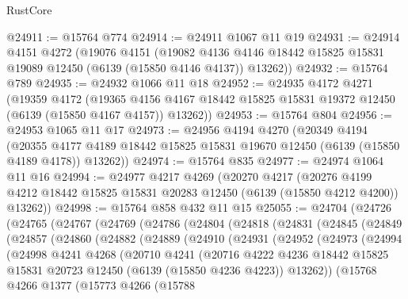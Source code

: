 \begin{lexlean}{RustCore}
\begin{coremodule}
@24911 := @15764 @774
@24914 := @24911 @1067 @11 @19
@24931 := @24914
    @4151
    @4272
    (@19076
      @4151
      (@19082 @4136 @4146 @18442 @15825 @15831 @19089 @12450 (@6139 (@15850 @4146 @4137)) @13262))
@24932 := @15764 @789
@24935 := @24932 @1066 @11 @18
@24952 := @24935
    @4172
    @4271
    (@19359
      @4172
      (@19365 @4156 @4167 @18442 @15825 @15831 @19372 @12450 (@6139 (@15850 @4167 @4157)) @13262))
@24953 := @15764 @804
@24956 := @24953 @1065 @11 @17
@24973 := @24956
    @4194
    @4270
    (@20349
      @4194
      (@20355 @4177 @4189 @18442 @15825 @15831 @19670 @12450 (@6139 (@15850 @4189 @4178)) @13262))
@24974 := @15764 @835
@24977 := @24974 @1064 @11 @16
@24994 := @24977
    @4217
    @4269
    (@20270
      @4217
      (@20276 @4199 @4212 @18442 @15825 @15831 @20283 @12450 (@6139 (@15850 @4212 @4200)) @13262))
@24998 := @15764 @858 @432 @11 @15
@25055 := @24704
    (@24726
      (@24765
        (@24767
          (@24769
            (@24786
              (@24804
                (@24818
                  (@24831
                    (@24845
                      (@24849
                        (@24857
                          (@24860
                            (@24882
                              (@24889
                                (@24910
                                  (@24931
                                    (@24952
                                      (@24973
                                        (@24994
                                          (@24998
                                            @4241
                                            @4268
                                            (@20710
                                              @4241
                                              (@20716
                                                @4222
                                                @4236
                                                @18442
                                                @15825
                                                @15831
                                                @20723
                                                @12450
                                                (@6139 (@15850 @4236 @4223))
                                                @13262))
                                            (@15768
                                              @4266
                                              @1377
                                              (@15773
                                                @4266
                                                (@15788

\end{coremodule}
\end{lexlean}
